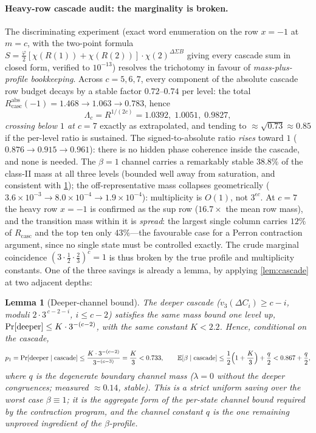 \documentclass[11pt]{article}
\newcommand{\E}{\mathbb{E}}
\theoremstyle{plain}
\newtheorem{lemma}{Lemma}
\theoremstyle{definition}
\theoremstyle{remark}
\begin{document}
\paragraph{Heavy-row cascade audit: the marginality is broken.} The
discriminating experiment (exact word enumeration on the row $x=-1$ at
$m=c$, with the two-point formula
$S=\tfrac{\varphi}2[\chi(R(1))+\chi(R(2))]\cdot\chi(2)^{\Delta\Sigma B}$
giving every cascade sum in closed form, verified to $10^{-13}$) resolves
the trichotomy in favour of \emph{mass-plus-profile bookkeeping}. Across
$c=5,6,7$, every component of the absolute cascade row budget decays by a
stable factor $0.72$--$0.74$ per level: the total
$R^{\mathrm{abs}}_{\mathrm{casc}}(-1)=1.468\to1.063\to0.783$, hence
\[
\Lambda_c=R^{1/(2c)}=1.0392,\;1.0051,\;\mathbf{0.9827},
\]
\emph{crossing below $1$ at $c=7$} exactly as extrapolated, and tending to
$\approx\sqrt{0.73}\approx0.85$ if the per-level ratio is sustained. The
signed-to-absolute ratio \emph{rises} toward $1$
($0.876\to0.915\to0.961$): there is no hidden phase coherence inside the
cascade, and none is needed. The $\beta{=}1$ channel carries a remarkably
stable $38.8\%$ of the class-II mass at all three levels (bounded well
away from saturation, and consistent with \cref{lem:betachannel}); the
off-representative mass collapses geometrically
($3.6\times10^{-3}\to8.0\times10^{-4}\to1.9\times10^{-4}$): multiplicity
is $O(1)$, not $3^{\epsilon c}$. At $c=7$ the heavy row $x=-1$ is
confirmed as the sup row ($16.7\times$ the mean row mass), and the
transition mass within it is \emph{spread}: the largest single column
carries $12\%$ of $R_{\mathrm{casc}}$ and the top ten only $43\%$---the
favourable case for a Perron contraction argument, since no single state
must be controlled exactly. The crude marginal coincidence
$(3\cdot\frac12\cdot\frac23)^c=1$ is thus broken by the true profile and
multiplicity constants. One of the three savings is already a lemma, by applying
\cref{lem:cascade} at two adjacent depths:

\begin{lemma}[Deeper-channel bound]\label{lem:betachannel}
The deeper cascade ($v_3(\Delta C_i)\ge c-i$, moduli $2\cdot3^{\,c-2-i}$,
$i\le c-2$) satisfies the same mass bound one level up,
$\Pr[\textnormal{deeper}]\le K\cdot3^{-(c-2)}$, with the same constant
$K<2.2$. Hence, conditional on the cascade,
\[
p_1=\Pr[\textnormal{deeper}\mid\textnormal{cascade}]
\le\frac{K\cdot3^{-(c-2)}}{3^{-(c-3)}}=\frac K3<0.733,
\qquad
\E[\beta\mid\textnormal{cascade}]
\le\frac12\Bigl(1+\frac K3\Bigr)+\frac q2<0.867+\frac q2,
\]
where $q$ is the degenerate boundary channel mass
($\lambda=0$ without the deeper congruences; measured $\approx0.14$,
stable). This is a strict uniform saving over the worst case
$\beta\equiv1$; it is the aggregate form of the per-state channel bound
required by the contraction program, and the channel constant $q$ is the
one remaining unproved ingredient of the $\beta$-profile.
\end{lemma}
\end{document}
